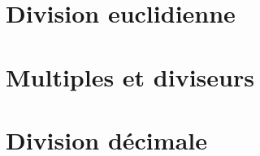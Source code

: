 \documentclass[12pt,a4paper]{article}
\date{}
\title{}
\begin{document}







\section{Division euclidienne}






\section{Multiples et diviseurs}







\section{Division décimale}


\end{document}
